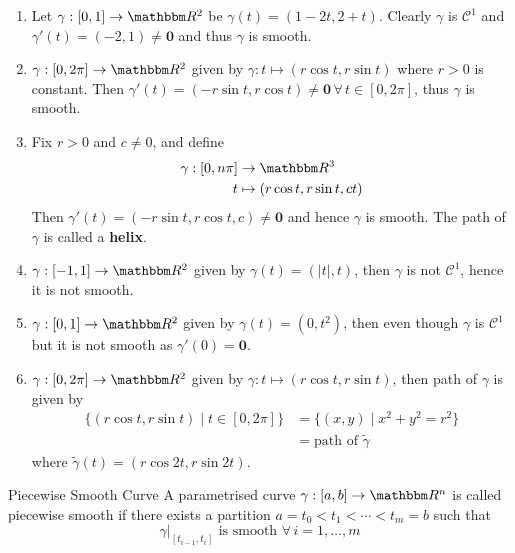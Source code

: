 \documentclass[../Analysis-3]{subfiles}
\begin{document}
\begin{Eg}{}{}
    \begin{enumerate}
        \item Let $\gamma : [0,1] \to \R^2$ be $\gamma(t) = (1-2t,2+t)$. Clearly $\gamma$ is $\mathscr{C}^1$ and $\gamma'(t) = (-2,1) \neq \mathbf{0}$ and thus $\gamma$ is smooth.
    
        \item $\gamma : [0,2\pi] \to \R^2$ given by $\gamma : t \mapsto (r \cos t , r \sin t)$ where $r > 0$ is constant. Then $\gamma'(t) = (-r\sin t , r \cos t) \neq \mathbf{0} \, \forall \, t \in [0,2\pi]$, thus $\gamma$ is smooth. 
        
        \item Fix $r > 0$ and $c \neq 0$, and define 
        \begin{align*}
            \gamma : [0, n\pi] &\to \R^3 \\
            t &\mapsto (r\cos t, r\sin t , ct) 
        \end{align*}
        Then $\gamma'(t) = ( -r\sin t, r \cos t, c ) \neq \mathbf{0}$ and hence $\gamma$ is smooth. The path of $\gamma$ is called a \textbf{helix}. 

        \item $\gamma : [-1,1] \to \R^2$ given by $\gamma(t) = (|t|, t)$, then $\gamma$ is not $\mathscr{C}^1$, hence it is not smooth. 
        \item $\gamma : [0,1] \to \R^2$ given by $\gamma(t) = (0,t^2)$, then even though $\gamma$ is $\mathscr{C}^1$ but it is not smooth as $\gamma'(0) = \mathbf{0}$.
        \item $\gamma : [0,2\pi] \to \R^2$ given by $\gamma : t \mapsto (r\cos t, r\sin t)$, then path of $\gamma$ is given by 
        \begin{align*}
            \{ (r\cos t, r\sin t) \mid t \in [0,2\pi] \} &= \{ (x,y) \mid x^2 + y^2 = r^2\}    \\ 
            &= \mbox{path of } \tilde{\gamma}
        \end{align*}
        where $\tilde{\gamma}(t) = (r \cos 2t , r \sin 2t)$.
    \end{enumerate}
\end{Eg}

\begin{Def}{Piecewise Smooth Curve}{}
    A parametrised curve $\gamma : [a,b] \to \R^n$ is called piecewise smooth if there exists a partition $a = t_0 < t_1 < \cdots < t_m = b $ such that 
    \[
        \gamma\vert_{[t_{i-1}, t_i]} \mbox{ is smooth } \forall \, i = 1, \dots, m    
    \]
\end{Def}
\end{document}
